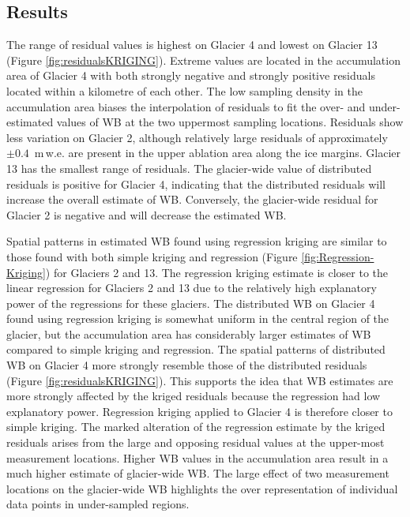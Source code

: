 \documentclass[onecolumn, letterpaper]{igs}
\begin{document}
\subsection{Results}

The range of residual values is highest on Glacier 4 and lowest on Glacier 13 (Figure \ref{fig:residualsKRIGING}). Extreme values are located in the accumulation area of Glacier 4 with both strongly negative and strongly positive residuals located within a kilometre of each other. The low sampling density in the accumulation area biases the interpolation of residuals to fit the over- and under-estimated values of WB at the two uppermost sampling locations. Residuals show less variation on Glacier 2, although relatively large residuals of approximately $\pm 0.4$ \,m\,w.e. are present in the upper ablation area along the ice margins. Glacier 13 has the smallest range of residuals. The glacier-wide value of distributed residuals is positive for Glacier 4, indicating that the distributed residuals will increase the overall estimate of WB. Conversely, the glacier-wide residual for Glacier 2 is negative and will decrease the estimated WB. 

Spatial patterns in estimated WB found using regression kriging are similar to those found with both simple kriging and regression (Figure \ref{fig:Regression-Kriging}) for Glaciers 2 and 13. The regression kriging estimate is closer to the linear regression for Glaciers 2 and 13 due to the relatively high explanatory power of the regressions for these glaciers. The distributed WB on Glacier 4 found using regression kriging is somewhat uniform in the central region of the glacier, but the accumulation area has considerably larger estimates of WB compared to simple kriging and regression. The spatial patterns of distributed WB on Glacier 4 more strongly resemble those of the distributed residuals (Figure \ref{fig:residualsKRIGING}). This supports the idea that WB estimates are more strongly affected by the kriged residuals because the regression had low explanatory power. Regression kriging applied to Glacier 4 is therefore closer to simple kriging. The marked alteration of the regression estimate by the kriged residuals arises from the large and opposing residual values at the upper-most measurement locations. Higher WB values in the accumulation area result in a much higher estimate of glacier-wide WB. The large effect of two measurement locations on the glacier-wide WB highlights the over representation of individual data points in under-sampled regions.
\end{document}

